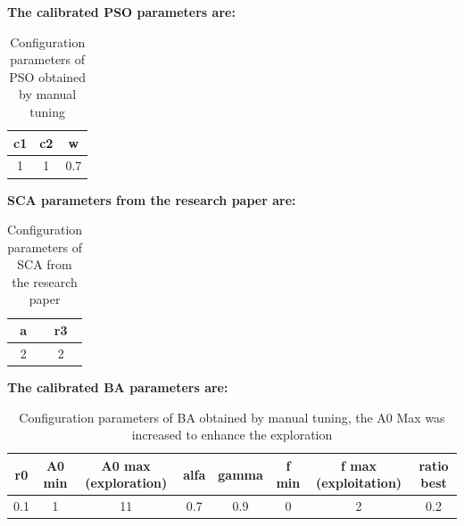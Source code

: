 \documentclass[12pt]{article}
\begin{document}
\textbf{The calibrated PSO parameters are:}
\begin{table}[H]    
\centering
\footnotesize
\begin{tabular}{ccc}

\hline
c1&    c2&    w \\
\hline

1&    1&    0.7\\

\hline 
\end{tabular} 

\caption{Configuration parameters of PSO obtained by manual tuning} 
\end{table}


\textbf{SCA parameters from the research paper are:}
\begin{table}[H]    
\centering
\footnotesize
\begin{tabular}{cc}

\hline
a&    r3 \\
\hline

2&    2 \\

\hline 
\end{tabular} 

\caption{Configuration parameters of SCA from the research paper} 
\end{table}



\textbf{The calibrated BA parameters are:}
\begin{table}[H]    
    \centering
    \footnotesize
    \begin{tabular}{cccccccc}
        
        \hline
        r0&    A0 min&    A0 max (exploration)&    alfa&    gamma&    f min&    f max (exploitation)&    ratio best\\
        
        \hline
        0.1&    1&    11&    0.7&    0.9&    0&    2&    0.2\\
        

        
        \hline 
    \end{tabular} 
    
    \caption{Configuration parameters of BA obtained by manual tuning, the A0 Max was increased to enhance the exploration} 
\end{table}
\end{document}
